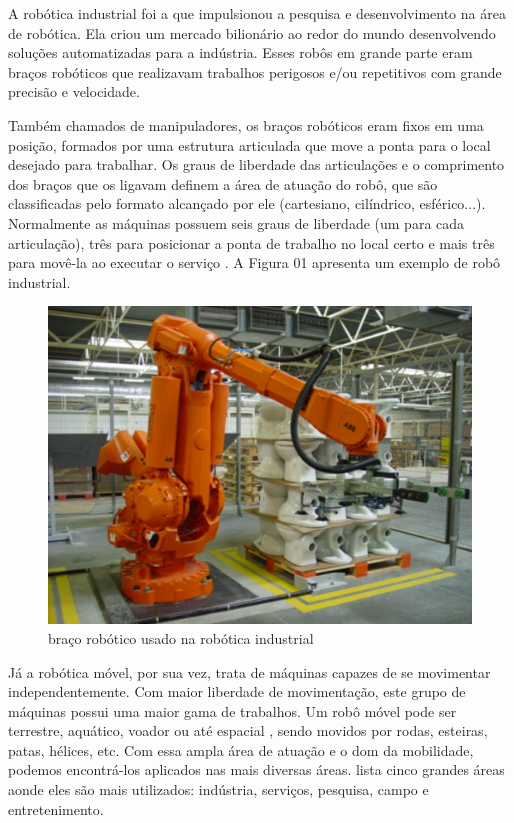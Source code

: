A robótica industrial foi a que impulsionou a pesquisa e desenvolvimento na área de robótica. Ela criou um mercado bilionário ao redor do mundo desenvolvendo soluções automatizadas para a indústria. Esses robôs em grande parte eram braços robóticos que realizavam trabalhos perigosos e/ou repetitivos com grande precisão e velocidade. 

Também chamados de manipuladores, os braços robóticos eram fixos em uma posição, formados por uma estrutura articulada que move a ponta para o local desejado para trabalhar. Os graus de liberdade das articulações e o comprimento dos braços que os ligavam definem a área de atuação do robô, que são classificadas pelo formato alcançado por ele (cartesiano, cilíndrico, esférico...). Normalmente as máquinas possuem seis graus de liberdade (um para cada articulação), três para posicionar a ponta de trabalho no local certo e mais três para movê-la ao executar o serviço \cite{Abreu2001}. A Figura 01 apresenta um exemplo de robô industrial.

\begin{figure}[h]
	\centering
	\label{fig01}
		\includegraphics[keepaspectratio=true,scale=0.6]{figuras/1bracorobotico.jpg}
	\caption{braço robótico usado na robótica industrial \cite{IMG_ROB_IND_SITE}}
\end{figure}

Já a robótica móvel, por sua vez, trata de máquinas capazes de se movimentar independentemente. Com maior liberdade de movimentação, este grupo de máquinas possui uma maior gama de trabalhos. Um robô móvel pode ser terrestre, aquático, voador ou até espacial \cite{Vieira2005}, sendo movidos por rodas, esteiras, patas, hélices, etc. Com essa ampla área de atuação e o dom da mobilidade, podemos encontrá-los aplicados nas mais diversas áreas. \cite{Pereira2003} lista cinco grandes áreas aonde eles são mais utilizados: indústria, serviços, pesquisa, campo e entretenimento.

